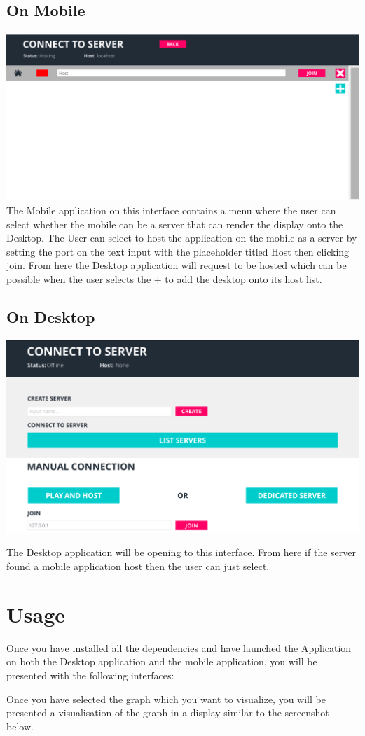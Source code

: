 \documentclass[english]{article}
\begin{document}
\subsection{On Mobile}
\includegraphics[scale=0.4]{mobileScreen.png}
The Mobile application on this interface contains a menu where the user can select whether the mobile can be a server that can render the display onto the Desktop. The User can select to host the application on the mobile as a server by setting the port on the text input with the placeholder titled Host then clicking join. From here the Desktop application will request to be hosted which can be possible when the user selects the + to add the desktop onto its host list.

\subsection{On Desktop}
\includegraphics[scale=0.4]{deskInteraction.png}

The Desktop application will be opening to this interface. From here if the server found a mobile application host then the user can just select.

\section{Usage} 
\begin{flushleft}
Once you have installed all the dependencies and have launched the Application on both the Desktop application and the mobile application, you will be presented with the following interfaces:

Once you have selected the graph which you want to visualize, you will be presented a visualisation of the graph in a display similar to the screenshot below.
\end{flushleft}
    
\end{document}
